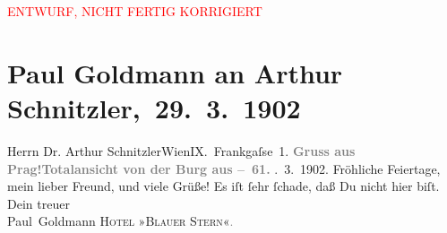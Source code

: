 
\begin{center}
            \textcolor{red}{ENTWURF, NICHT FERTIG KORRIGIERT}
                      \end{center}
            
         \renewcommand{\erwaehnteOrte}{Orte: Frankgasse, Hotel Blauer Stern, Prag, Prager Burg, Wien}
         \renewcommand{\erwaehnteWerke}{}
               \section[ Paul Goldmann an Arthur Schnitzler, 29. 3. 1902]{ Paul Goldmann an Arthur Schnitzler, 29. 3. 1902}\nopagebreak{}\rehead{ }\begin{ledgroupsized}[t]{13cm}\normalsize\beginnumbering \toendnotes[C]{\smallbreak\pagebreak[2]} 
\toendnotes[C]{\smallbreak}\pstart{}{\pb}Herrn Dr. Arthur Schnitzler\pend{}\pstart{}Wien\pend{}\pstart{}IX. Frankgaſse 1.\pend{}{\bigskip}\pstart
           \noindent{}{\pb}\textcolor{gray}{\textbf{Gruss aus Prag!}}\hfill \textcolor{gray}{\textbf{Totalansicht von der Burg aus – 61.}}\pend
           . 3. 1902.\pend
           \pstart
           Fröhliche Feiertage, mein lieber Freund, und viele
               Grüße! Es iſt ſehr ſchade, daß Du nicht hier biſt. Dein treuer {\\}\spacefill\mbox{Paul Goldmann}\pend
           \pstart
           \noindent{}\textsc{Hotel »Blauer Stern«}\textcolor{gray}{.}\pend
           
         
         \endnumbering{}\end{ledgroupsized}\begin{anhang}\end{anhang}\newcommand{\dateiname}{L03202}\newcommand{\titel}{Paul Goldmann an Arthur Schnitzler, 29. 3. 1902}\newcommand{\editorInnen}{Martin Anton Müller und Laura Untner}
      